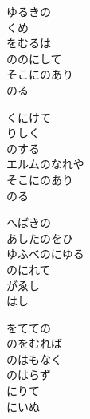 \documentclass[10pt,b5j]{tarticle} %
\begin{document}
\vspace{1.5em} %
\newcommand{\linespace}{0.5em} %
\newcommand{\blocksize}{0.5\hsize} %
\begin{enumerate} %
    \begin{minipage}[c]{\blocksize}
    
        \vspace{\linespace}
        \item
        ゆるきの\\
        くめ\\
        をむるは\\
        ののにして\\
        そこにのあり\\
        のる
        
        \vspace{\linespace}
        \item
        くにけて\\
        りしく\\
        のする\\
        エルムのなれや\\
        そこにのあり\\
        のる
        
        \vspace{\linespace}
        \item
        へばきの\\
        あしたのをひ\\
        ゆふべのにゆる\\
        のにれて\\
        がゑし\\
        はし
        
        \vspace{\linespace}
        \item
        をてての\\
        のをむれば\\
        のはもなく\\
        のはらず\\
        にりて\\
        にいぬ
        

\end{minipage}
\end{enumerate}
\end{document}
